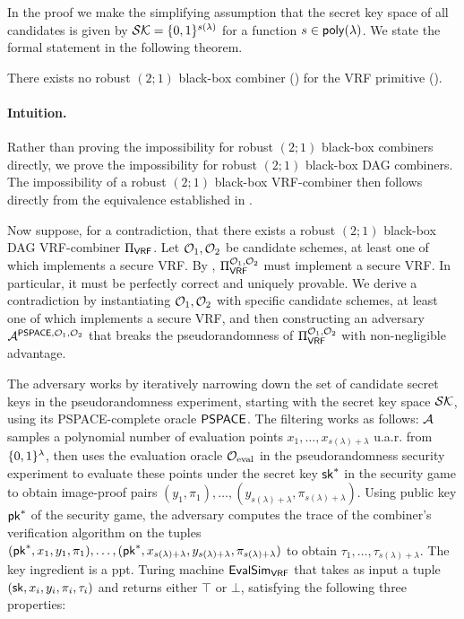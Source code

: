 In the proof we make the simplifying assumption that the secret key space 
of all candidates is given by $\mathcal{SK} = \{0,1\}^{s(\lambda)}$ for a function $s \in \poly$.
We state the formal statement in the following theorem.

\begin{theorem}\label{thm:impossibility_21_comb}
	There exists no robust $(2;1)$ black-box combiner () for the VRF primitive ().
\end{theorem}

\paragraph{Intuition.}
Rather than proving the impossibility for robust $(2;1)$ black-box combiners directly, we prove the impossibility for 
robust $(2;1)$ black-box DAG combiners. The impossibility of a robust $(2;1)$ black-box VRF-combiner
then follows directly from the equivalence established in .

Now suppose, for a contradiction, that there exists a robust $(2;1)$ black-box DAG VRF-combiner $\BBComb{VRF}$.
Let $\mathcal{O}_1, \mathcal{O}_2$ be candidate schemes, at least one of which implements a secure VRF.
By , $\BBComb{VRF}[\O_1, \O_2]$ must implement a secure VRF. 
In particular, it must be perfectly correct 
and uniquely provable. We derive a contradiction by instantiating $\mathcal{O}_1,\mathcal{O}_2$
with specific candidate schemes, at least one of which implements a secure VRF,
and then constructing an adversary $\mathcal{A}^{\textup{\textsf{PSPACE}}, \mathcal{O}_1,\mathcal{O}_2}$ that breaks the pseudorandomness of 
$\BBComb{VRF}[\O_1, \O_2]$ with non-negligible advantage.

The adversary works by iteratively narrowing down the set of candidate secret keys in the 
pseudorandomness experiment, starting with the secret key space $\mathcal{SK}$, using its PSPACE-complete
oracle $\textup{\textsf{PSPACE}}$. The filtering works as follows: $\mathcal{A}$ samples a polynomial number of evaluation points
$x_1, \ldots, x_{s(\lambda) + \lambda}$ u.a.r. from $\{0,1\}^\lambda$, then uses the evaluation oracle $\mathcal{O}_{\text{eval}}$
in the pseudorandomness security experiment to evaluate these points under the secret key $\textup{\textsf{sk}}^*$ in the security game to obtain image-proof pairs
$(y_1, \pi_1), \ldots, (y_{s(\lambda) + \lambda}, \pi_{s(\lambda) + \lambda})$.
Using public key $\textup{\textsf{pk}}^*$ of the security game, the adversary computes the trace of the combiner's verification algorithm on the tuples 
$(\textup{\textsf{pk}}^*, x_1, y_1, \pi_1),\ldots, (\textup{\textsf{pk}}^*, x_{s(\lambda) + \lambda}, y_{s(\lambda) + \lambda},\pi_{s(\lambda) + \lambda})$ to obtain 
$\tau_1, \ldots, \tau_{s(\lambda) + \lambda}$.
The key ingredient is a ppt. Turing machine $\alg{EvalSim}{VRF}$ that takes as input 
a tuple $(\textup{\textsf{sk}},x_i,y_i,\pi_i,\tau_i)$ and returns either $\top$ or $\bot$, satisfying the following three properties:

